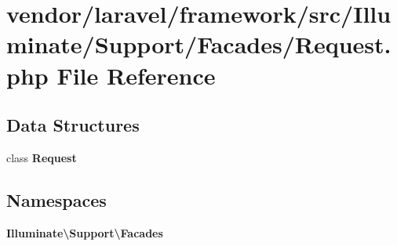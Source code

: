 \section{vendor/laravel/framework/src/\+Illuminate/\+Support/\+Facades/\+Request.php File Reference}
\label{vendor_2laravel_2framework_2src_2_illuminate_2_support_2_facades_2_request_8php}
\subsection*{Data Structures}
\begin{DoxyCompactItemize}
\item 
class {\bf Request}
\end{DoxyCompactItemize}
\subsection*{Namespaces}
\begin{DoxyCompactItemize}
\item 
 {\bf Illuminate\textbackslash{}\+Support\textbackslash{}\+Facades}
\end{DoxyCompactItemize}
